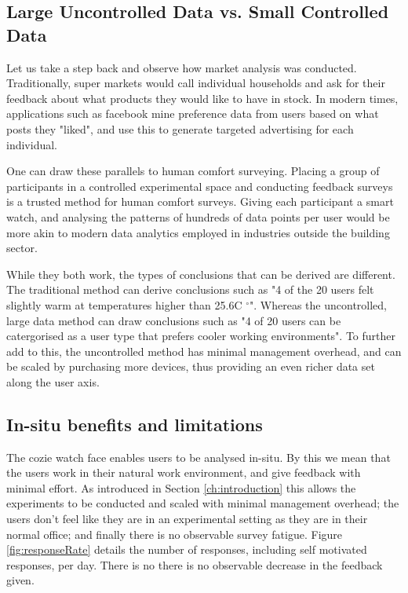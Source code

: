 
\subsection{Large Uncontrolled Data vs. Small Controlled Data}

Let us take a step back and observe how market analysis was conducted. Traditionally, super markets would call individual households and ask for their feedback about what products they would like to have in stock. In modern times, applications such as facebook mine preference data from users based on what posts they "liked", and use this to generate targeted advertising for each individual.

One can draw these parallels to human comfort surveying. Placing a group of participants in a controlled experimental space and conducting feedback surveys is a trusted method for human comfort surveys. Giving each participant a smart watch, and analysing the patterns of hundreds of data points per user would be more akin to modern data analytics employed in industries outside the building sector. 



While they both work, the types of conclusions that can be derived are different. The traditional method can derive conclusions such as "4 of the 20 users felt slightly warm at temperatures higher than 25.6C $^\circ$". Whereas the uncontrolled, large data method can draw conclusions such as "4 of 20 users can be catergorised as a user type that prefers cooler working environments". To further add to this, the uncontrolled method has minimal management overhead, and can be scaled by purchasing more devices, thus providing an even richer data set along the user axis. 

\subsection{In-situ benefits and limitations}

The cozie watch face enables users to be analysed in-situ. By this we mean that the users work in their natural work environment, and give feedback with minimal effort. As introduced in Section \ref{ch:introduction} this allows the experiments to be conducted and scaled with minimal management overhead; the users don't feel like they are in an experimental setting as they are in their normal office; and finally there is no observable survey fatigue. Figure \ref{fig:responseRate} details the number of responses, including self motivated responses, per day. There is no there is no observable decrease in the feedback given.\\

